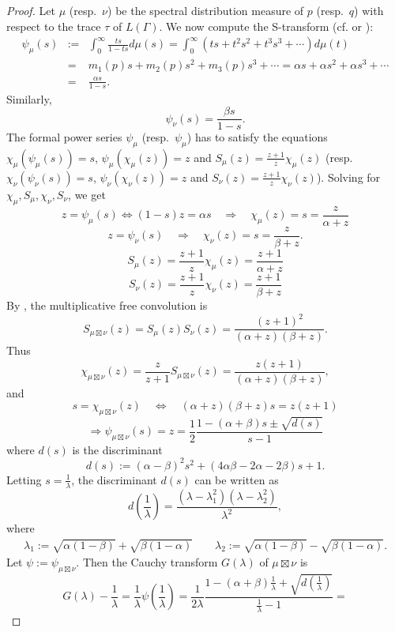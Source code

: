 \documentclass{amsart}
\newcommand{\imply}{\Longrightarrow}
\theoremstyle{definition}
\begin{document}
\begin{proof}
Let $\mu$ (resp.~$\nu$) be the spectral distribution measure of $p$ (resp.~$q$) with respect to the trace $\tau$ of $L(\Gamma)$.
We now compute the S-transform (cf.\cite[p.30-32]{Voiculescu} or \cite{Voiculescu87}):
\begin{eqnarray*}
\psi_{\mu}(s)&:=&\int_0^{\infty} \frac{t s}{1- t s}d\mu(s) = \int_0^{\infty} (ts +t^2s^2+t^3s^3+\cdots)d\mu(t)\\
&=&m_1(p)s +m_2(p)s^2+m_3(p) s^3+\cdots = \alpha s+\alpha s^2+\alpha s^3+\cdots\\
&=&\frac{\alpha s}{1-s}.
\end{eqnarray*}
Similarly,
$$
\psi_{\nu}(s)=\frac{\beta s}{1-s}.
$$
The formal power series $\psi_\mu$ (resp.~$\psi_\mu$) has to satisfy the equations $\chi_\mu(\psi_\mu(s))=s$, $\psi_\mu(\chi_\mu(z))=z$ and $S_\mu(z)=\frac{z+1}{z}\chi_\mu(z)$ (resp.~$\chi_\nu(\psi_\nu(s))=s$, $\psi_\nu(\chi_\nu(z))=z$ and $S_\nu(z)=\frac{z+1}{z}\chi_\nu(z)$).
Solving for $\chi_\mu,S_\mu,\chi_\nu,S_\nu$, we get
$$z=\psi_{\mu}(s) \iff (1-s)z =\alpha  s \quad \imply \quad  \chi_{\mu}(z)=s=\frac{z}{\alpha +z}$$
$$z=\psi_{\nu}(s)  \quad \imply \quad  \chi_{\nu}(z)=s=\frac{z}{\beta +z}.$$
$$S_{\mu}(z)=\frac{z+1}{z}\chi_{\mu}(z)=\frac{z+1}{\alpha +z}$$
$$S_{\nu}(z)=\frac{z+1}{z}\chi_{\nu}(z)=\frac{z+1}{\beta +z}$$
By \cite[Theorem 3.6.3]{Voiculescu}, the multiplicative free convolution is 
$$S_{\mu\boxtimes\nu}(z)= S_{\mu}(z)S_{\nu}(z)=\frac{(z+1)^2}{(\alpha +z)(\beta +z)}.$$
Thus
$$\chi_{\mu\boxtimes\nu}(z)= \frac{z}{z+1}S_{\mu\boxtimes\nu}(z)=\frac{z(z+1)}{(\alpha +z)(\beta +z)},$$
and 
$$ s=\chi_{\mu\boxtimes\nu}(z)\quad\iff\quad (\alpha +z)(\beta +z)s=z(z+1)$$
$$\imply \psi_{\mu\boxtimes\nu}(s)=z=\frac12\frac{1-(\alpha +\beta )s\pm \sqrt{d(s)}}{s-1}$$
where $d(s)$ is the discriminant 
$$d(s):=(\alpha -\beta )^2 s^2+(4\alpha \beta -2\alpha -2\beta )s+1.$$ 
Letting $s=\frac1{\lambda}$, the discriminant $d(s)$  can be written as 
$$d(\frac1{\lambda})=\frac{(\lambda-\lambda_1^2)(\lambda-\lambda_2^2)}{\lambda^2},$$
where
\begin{eqnarray*}
\lambda_1:=\sqrt{\alpha (1-\beta )}+\sqrt{\beta (1-\alpha )}\qquad\lambda_2:=\sqrt{\alpha (1-\beta )}-\sqrt{\beta (1-\alpha )}.
\end{eqnarray*}
Let $\psi:=\psi_{\mu\boxtimes\nu}$. Then the Cauchy transform $G(\lambda)$ of $\mu\boxtimes\nu$ is 
$$G(\lambda)-\frac1{\lambda}=\frac1{\lambda}\psi(\frac1{\lambda})=\frac1{2\lambda}\frac{1-(\alpha +\beta )\frac1{\lambda}+\sqrt{d(\frac1{\lambda})}}{\frac1{\lambda}-1}=
$$
\end{proof}
\end{document}
